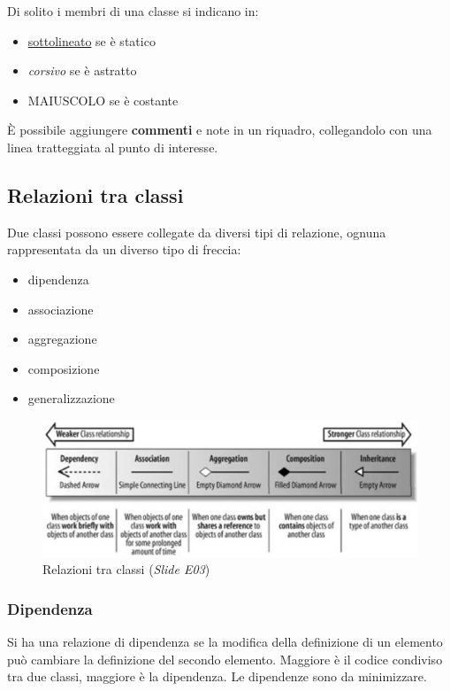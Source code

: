 Di solito i membri di una classe si indicano in: %
\begin{itemize}
\item \underline{sottolineato} se è statico
\item \textit{corsivo} se è astratto
\item MAIUSCOLO se è costante
\end{itemize}

\`E possibile aggiungere \textbf{commenti} e note in un riquadro, collegandolo con una linea tratteggiata al punto di interesse.

\subsection{Relazioni tra classi}

Due classi possono essere collegate da diversi tipi di relazione, ognuna rappresentata da un diverso tipo di freccia:
\begin{itemize}
\item dipendenza
\item associazione
\item aggregazione
\item composizione
\item generalizzazione
\end{itemize}

\begin{figure}[H]
\centering
    \includegraphics[width=1\textwidth]{res/img/relazioniClassi}
    \caption{Relazioni tra classi (\textit{Slide E03})}
\end{figure}

\subsubsection{Dipendenza}
Si ha una relazione di dipendenza se la modifica della definizione di un elemento può cambiare la definizione del secondo elemento. 
Maggiore è il codice condiviso tra due classi, maggiore è la dipendenza. Le dipendenze sono da minimizzare.

